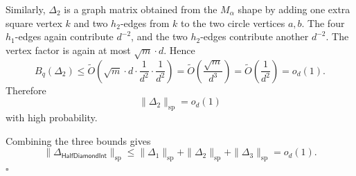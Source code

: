 \documentclass[10pt,a4paper]{amsart}
\renewenvironment{proof}{{\emph{Proof.}  }}{\hfill$\square$ \vspace{8pt}}
\begin{document}
\begin{proof}
Similarly, \(\Delta_2\) is a graph matrix obtained from the \(M_\alpha\) shape by adding one
extra square vertex \(k\) and two \(h_2\)-edges from \(k\) to the two circle vertices \(a,b\). The
four \(h_1\)-edges again contribute \(d^{-2}\), and the two \(h_2\)-edges contribute another
\(d^{-2}\). The vertex factor is again at most \(\sqrt m\cdot d\). Hence
\[
    B_q(\Delta_2)
    \le
    \widetilde O\!\left(
        \sqrt m\cdot d\cdot \frac1{d^2}\cdot \frac1{d^2}
    \right)
    =
    \widetilde O\!\left(\frac{\sqrt m}{d^3}\right)
    =
    \widetilde O\!\left(\frac1{d^2}\right)
    =
    o_d(1).
\]
Therefore
\[
    \|\Delta_2\|_{\mathrm{sp}}=o_d(1)
\]
with high probability.

Combining the three bounds gives
\[
    \|\Delta_{\mathsf{HalfDiamondInt}}\|_{\mathrm{sp}}
    \le
    \|\Delta_1\|_{\mathrm{sp}}
    +
    \|\Delta_2\|_{\mathrm{sp}}
    +
    \|\Delta_3\|_{\mathrm{sp}}
    =
    o_d(1).
\]
\end{proof}
\end{document}
